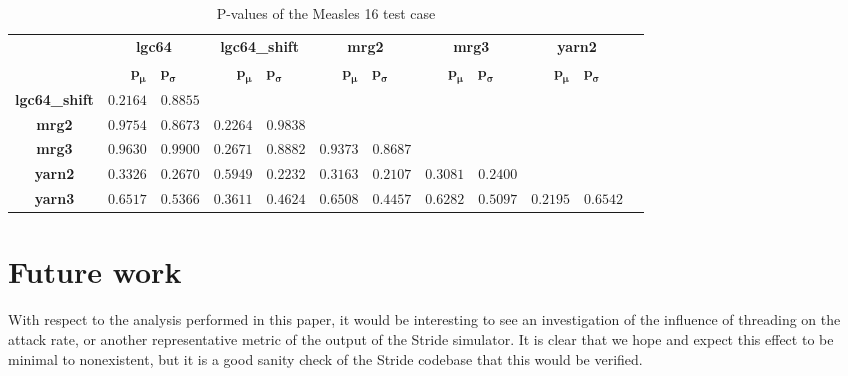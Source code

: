 \documentclass{acmart}
\begin{document}
\begin{table}[!hbt]
    \begin{tabular}{c|c|c|c|c|c|c}
        & \textbf{lgc64} & \textbf{lgc64\_shift} & \textbf{mrg2} & \textbf{mrg3} & \textbf{yarn2} \\
        &  \( \bm{p_\mu} \quad \bm{p_\sigma} \)
            &  \( \bm{p_\mu} \quad \bm{p_\sigma} \)
            &  \( \bm{p_\mu} \quad \bm{p_\sigma} \)
            &  \( \bm{p_\mu} \quad \bm{p_\sigma} \)
            &  \( \bm{p_\mu} \quad \bm{p_\sigma} \) \\
        \textbf{lgc64\_shift}
            & \( 0.2164 \quad 0.8855 \)
            & \cellcolor{gray}
            & \cellcolor{gray}
            & \cellcolor{gray}
            & \cellcolor{gray} \\
        \textbf{mrg2}      
            & \( 0.9754 \quad 0.8673 \) 
            & \( 0.2264 \quad 0.9838 \) 
            & \cellcolor{gray}
            & \cellcolor{gray}
            & \cellcolor{gray} \\
        \textbf{mrg3}          
            & \( 0.9630 \quad 0.9900 \)
            & \( 0.2671 \quad 0.8882 \) 
            & \( 0.9373 \quad 0.8687 \) 
            & \cellcolor{gray}
            & \cellcolor{gray} \\
        \textbf{yarn2}        
            & \( 0.3326 \quad 0.2670 \)  
            & \( 0.5949 \quad 0.2232 \)  
            & \( 0.3163 \quad 0.2107 \) 
            & \( 0.3081 \quad 0.2400 \)  
            & \cellcolor{gray} \\
        \textbf{yarn3}          
            & \( 0.6517 \quad 0.5366 \)  
            & \( 0.3611 \quad 0.4624 \) 
            & \( 0.6508 \quad 0.4457 \)
            & \( 0.6282 \quad 0.5097 \) 
            & \( 0.2195 \quad 0.6542 \) \\
    \end{tabular}
    \caption{P-values of the Measles 16 test case}
    \label{tab:measles_16:p_values}
\end{table}

\section{Future work}

With respect to the analysis performed in this paper, it would be interesting to see an investigation of the influence of threading on the attack rate, or another representative metric of the output of the Stride simulator. It is clear that we hope and expect this effect to be minimal to nonexistent, but it is a good sanity check of the Stride codebase that this would be verified.
\end{document}
